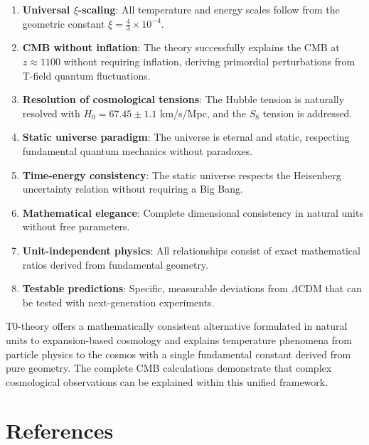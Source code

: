 \documentclass[12pt,a4paper]{article}
\theoremstyle{definition}
\theoremstyle{remark}
\begin{document}
	\begin{enumerate}
		\item \textbf{Universal $\xi$-scaling}: All temperature and energy scales follow from the geometric constant $\xi = \frac{4}{3} \times 10^{-4}$.
		
		\item \textbf{CMB without inflation}: The theory successfully explains the CMB at $z \approx 1100$ without requiring inflation, deriving primordial perturbations from T-field quantum fluctuations.
		
		\item \textbf{Resolution of cosmological tensions}: The Hubble tension is naturally resolved with $H_0 = 67.45 \pm 1.1$ km/s/Mpc, and the $S_8$ tension is addressed.
		
		\item \textbf{Static universe paradigm}: The universe is eternal and static, respecting fundamental quantum mechanics without paradoxes.
		
		\item \textbf{Time-energy consistency}: The static universe respects the Heisenberg uncertainty relation without requiring a Big Bang.
		
		\item \textbf{Mathematical elegance}: Complete dimensional consistency in natural units without free parameters.
		
		\item \textbf{Unit-independent physics}: All relationships consist of exact mathematical ratios derived from fundamental geometry.
		
		\item \textbf{Testable predictions}: Specific, measurable deviations from $\Lambda$CDM that can be tested with next-generation experiments.
	\end{enumerate}
	
	\begin{revolutionary}
		T0-theory offers a mathematically consistent alternative formulated in natural units to expansion-based cosmology and explains temperature phenomena from particle physics to the cosmos with a single fundamental constant derived from pure geometry. The complete CMB calculations demonstrate that complex cosmological observations can be explained within this unified framework.
	\end{revolutionary}
	
	\section{References}
	
\end{document}
